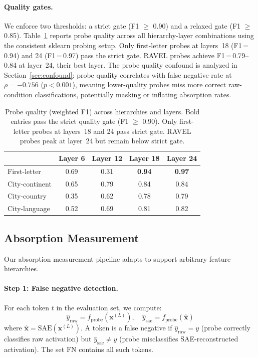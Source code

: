 \documentclass{article}
\begin{document}
\paragraph{Quality gates.} We enforce two thresholds: a strict gate (F1 $\geq$ 0.90) and a relaxed gate (F1 $\geq$ 0.85). Table~\ref{tab:probe_quality} reports probe quality across all hierarchy-layer combinations using the consistent sklearn probing setup. Only first-letter probes at layers~18 (F1\,=\,0.94) and 24 (F1\,=\,0.97) pass the strict gate. RAVEL probes achieve F1\,=\,0.79--0.84 at layer~24, their best layer. The probe quality confound is analyzed in Section~\ref{sec:confound}: probe quality correlates with false negative rate at $\rho = -0.756$ ($p < 0.001$), meaning lower-quality probes miss more correct raw-condition classifications, potentially masking or inflating absorption rates.

\begin{table}[t]
\caption{Probe quality (weighted F1) across hierarchies and layers. Bold entries pass the strict quality gate (F1 $\geq$ 0.90). Only first-letter probes at layers~18 and 24 pass strict gate. RAVEL probes peak at layer~24 but remain below strict gate.}
\label{tab:probe_quality}
\centering
\small
\begin{tabular}{@{}lcccc@{}}
\toprule
& Layer 6 & Layer 12 & Layer 18 & Layer 24 \\
\midrule
First-letter & 0.69 & 0.31 & \textbf{0.94} & \textbf{0.97} \\
City-continent & 0.65 & 0.79 & 0.84 & 0.84 \\
City-country & 0.35 & 0.62 & 0.78 & 0.79 \\
City-language & 0.52 & 0.69 & 0.81 & 0.82 \\
\bottomrule
\end{tabular}
\end{table}

\subsection{Absorption Measurement}
\label{sec:absorption_measurement}

Our absorption measurement pipeline adapts \citet{chanin2024absorption} to support arbitrary feature hierarchies.

\paragraph{Step 1: False negative detection.} For each token $t$ in the evaluation set, we compute:
\begin{equation}
\hat{y}_{\text{raw}} = f_{\text{probe}}(\mathbf{x}^{(L)}), \quad \hat{y}_{\text{sae}} = f_{\text{probe}}(\hat{\mathbf{x}})
\end{equation}
where $\hat{\mathbf{x}} = \text{SAE}(\mathbf{x}^{(L)})$. A token is a false negative if $\hat{y}_{\text{raw}} = y$ (probe correctly classifies raw activation) but $\hat{y}_{\text{sae}} \neq y$ (probe misclassifies SAE-reconstructed activation). The set $\text{FN}$ contains all such tokens.
\end{document}
